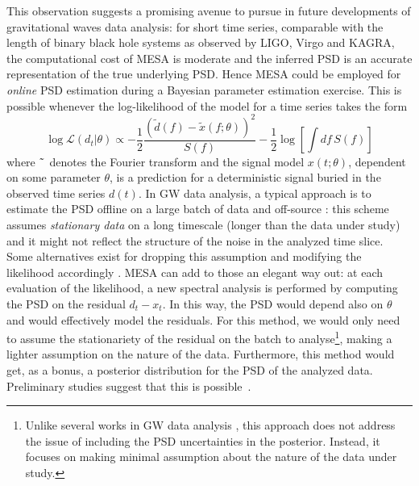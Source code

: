 \documentclass{aa}
\newcommand{\sschmidt}[1]{{\textcolor{red}{\texttt{SS: #1}} }}
\begin{document}
This observation suggests a promising avenue to pursue in future developments of gravitational waves data analysis: for short time series, comparable with the length of binary black hole systems as observed by LIGO, Virgo and KAGRA, the computational cost of MESA is moderate and the inferred PSD is an accurate representation of the true underlying PSD. Hence MESA could be employed for {\it online} PSD estimation during a Bayesian parameter estimation exercise.
This is possible whenever the log-likelihood of the model for a time series takes the form
\begin{equation}
	\log\mathcal{L}(d_t | \theta) \propto  -\frac{1}{2} \frac{(\tilde{d}(f)- \tilde{x}(f;\theta))^2}{S(f)} - \frac{1}{2}\log\left[\int  df\,S(f)\right]
\end{equation}
where $\tilde{\hphantom{a}}$ denotes the Fourier transform and the signal model $x(t;\theta)$, dependent on some parameter $\theta$, is a prediction for a deterministic signal buried in the observed time series $d(t)$.
In GW data analysis, a typical approach is to estimate the PSD offline on a large batch of data and off-source \cite{lalinference}: this scheme assumes {\it stationary data} on a long timescale (longer than the data under study) and it might not reflect the structure of the noise in the analyzed time slice.
Some alternatives exist for dropping this assumption and modifying the likelihood accordingly \cite{R_ver_2010, R_ver_2011, Edwards_2020, Edwards_2015}.
MESA can add to those an elegant way out: at each evaluation of the likelihood, a new spectral analysis is performed by computing the PSD on the residual $d_t-x_t$.
In this way, the PSD would depend also on $\theta$ and would effectively model the residuals. For this method, we would only need to assume the stationariety of the residual on the batch to analyse\footnote{
Unlike several works in GW data analysis \cite{Littenberg_2013, Biscoveanu_2020, talbot2020gravitationalwave}, this approach does not address the issue of including the PSD uncertainties in the posterior. Instead, it focuses on making minimal assumption about the nature of the data under study.
}, making a lighter assumption on the nature of the data. Furthermore, this method would get, as a bonus, a posterior distribution for the PSD of the analyzed data.
Preliminary studies suggest that this is possible~\cite{martini_thesis}.
\end{document}
